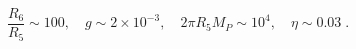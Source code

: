 \begin{equation}
\frac{R_6}{R_5} \sim 100, \quad g \sim 2\times 10^{-3},\quad 2 \pi R_5
M_P \sim 10^4, \quad \eta \sim 0.03 \;.
\end{equation}


